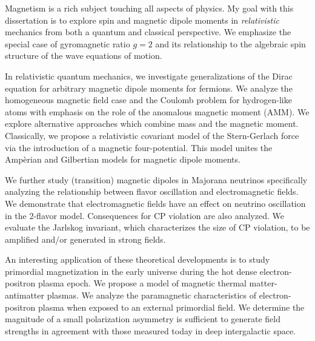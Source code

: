 

Magnetism is a rich subject touching all aspects of physics. My goal with this dissertation is to explore spin and magnetic dipole moments in \emph{relativistic} mechanics from both a quantum and classical perspective. We emphasize the special case of gyromagnetic ratio $g\!=\!2$ and its relationship to the algebraic spin structure of the wave equations of motion.

In relativistic quantum mechanics, we investigate generalizations of the Dirac equation for arbitrary magnetic dipole moments for fermions. We analyze the homogeneous magnetic field case and the Coulomb problem for hydrogen-like atoms with emphasis on the role of the anomalous magnetic moment (AMM). We explore alternative approaches which combine mass and the magnetic moment. Classically, we propose a relativistic covariant model of the Stern-Gerlach force via the introduction of a magnetic four-potential. This model unites the Amp{\`e}rian and Gilbertian models for magnetic dipole moments.

We further study (transition) magnetic dipoles in Majorana neutrinos specifically analyzing the relationship between flavor oscillation and electromagnetic fields. We demonstrate that electromagnetic fields have an effect on neutrino oscillation in the 2-flavor model. Consequences for CP violation are also analyzed. We evaluate the Jarlskog invariant, which characterizes the size of CP violation, to be amplified and/or generated in strong fields.

An interesting application of these theoretical developments is to study primordial magnetization in the early universe during the hot dense electron-positron plasma epoch. We propose a model of magnetic thermal matter-antimatter plasmas. We analyze the paramagnetic characteristics of electron-positron plasma when exposed to an external primordial field. We determine the magnitude of a small polarization asymmetry is sufficient to generate field strengths in agreement with those measured today in deep intergalactic space.